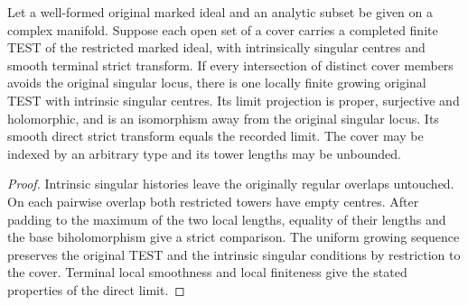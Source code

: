 \begin{theorem}
\label{hir:g8-regular-overlap-test-limit}
\leanok
Let a well-formed original marked ideal and an analytic subset be
given on a complex manifold. Suppose each open set of a cover
carries a completed finite TEST of the restricted marked ideal,
with intrinsically singular centres and smooth terminal strict
transform. If every intersection of distinct cover members
avoids the original singular locus, there is one locally finite
growing original TEST with intrinsic singular centres. Its limit
projection is proper, surjective and holomorphic, and is an
isomorphism away from the original singular locus. Its smooth
direct strict transform equals the recorded limit. The cover may
be indexed by an arbitrary type and its tower lengths may be
unbounded.
\end{theorem}
\begin{proof}
Intrinsic singular histories leave the originally regular overlaps
untouched. On each pairwise overlap both restricted towers have
empty centres. After padding to the maximum of the two local
lengths, equality of their lengths and the base biholomorphism
give a strict comparison. The uniform growing sequence preserves
the original TEST and the intrinsic singular conditions by
restriction to the cover. Terminal local smoothness and local
finiteness give the stated properties of the direct limit.
\end{proof}

